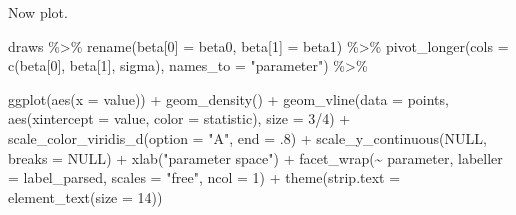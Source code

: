 \documentclass[
  letterpaper,
  DIV=11,
  numbers=noendperiod]{scrartcl}
\newenvironment{Shaded}{\begin{snugshade}}{\end{snugshade}}
\newcommand{\AttributeTok}[1]{\textcolor[rgb]{0.40,0.45,0.13}{#1}}
\newcommand{\ConstantTok}[1]{\textcolor[rgb]{0.56,0.35,0.01}{#1}}
\newcommand{\DecValTok}[1]{\textcolor[rgb]{0.68,0.00,0.00}{#1}}
\newcommand{\FunctionTok}[1]{\textcolor[rgb]{0.28,0.35,0.67}{#1}}
\newcommand{\NormalTok}[1]{\textcolor[rgb]{0.00,0.23,0.31}{#1}}
\newcommand{\OtherTok}[1]{\textcolor[rgb]{0.00,0.23,0.31}{#1}}
\newcommand{\SpecialCharTok}[1]{\textcolor[rgb]{0.37,0.37,0.37}{#1}}
\newcommand{\StringTok}[1]{\textcolor[rgb]{0.13,0.47,0.30}{#1}}
\begin{document}
Now plot.

\begin{Shaded}
\begin{Highlighting}[]
\NormalTok{draws }\SpecialCharTok{\%\textgreater{}\%} 
  \FunctionTok{rename}\NormalTok{(}\StringTok{\textasciigrave{}}\AttributeTok{beta[0]}\StringTok{\textasciigrave{}} \OtherTok{=}\NormalTok{ beta0,}
         \StringTok{\textasciigrave{}}\AttributeTok{beta[1]}\StringTok{\textasciigrave{}} \OtherTok{=}\NormalTok{ beta1) }\SpecialCharTok{\%\textgreater{}\%} 
  \FunctionTok{pivot\_longer}\NormalTok{(}\AttributeTok{cols =} \FunctionTok{c}\NormalTok{(}\StringTok{\textasciigrave{}}\AttributeTok{beta[0]}\StringTok{\textasciigrave{}}\NormalTok{, }\StringTok{\textasciigrave{}}\AttributeTok{beta[1]}\StringTok{\textasciigrave{}}\NormalTok{, sigma), }
               \AttributeTok{names\_to =} \StringTok{"parameter"}\NormalTok{) }\SpecialCharTok{\%\textgreater{}\%} 
  
  \FunctionTok{ggplot}\NormalTok{(}\FunctionTok{aes}\NormalTok{(}\AttributeTok{x =}\NormalTok{ value)) }\SpecialCharTok{+}
  \FunctionTok{geom\_density}\NormalTok{() }\SpecialCharTok{+}
  \FunctionTok{geom\_vline}\NormalTok{(}\AttributeTok{data =}\NormalTok{ points,}
             \FunctionTok{aes}\NormalTok{(}\AttributeTok{xintercept =}\NormalTok{ value, }\AttributeTok{color =}\NormalTok{ statistic),}
             \AttributeTok{size =} \DecValTok{3}\SpecialCharTok{/}\DecValTok{4}\NormalTok{) }\SpecialCharTok{+}
  \FunctionTok{scale\_color\_viridis\_d}\NormalTok{(}\AttributeTok{option =} \StringTok{"A"}\NormalTok{, }\AttributeTok{end =}\NormalTok{ .}\DecValTok{8}\NormalTok{) }\SpecialCharTok{+}
  \FunctionTok{scale\_y\_continuous}\NormalTok{(}\ConstantTok{NULL}\NormalTok{, }\AttributeTok{breaks =} \ConstantTok{NULL}\NormalTok{) }\SpecialCharTok{+}
  \FunctionTok{xlab}\NormalTok{(}\StringTok{"parameter space"}\NormalTok{) }\SpecialCharTok{+}
  \FunctionTok{facet\_wrap}\NormalTok{(}\SpecialCharTok{\textasciitilde{}}\NormalTok{ parameter, }\AttributeTok{labeller =}\NormalTok{ label\_parsed, }\AttributeTok{scales =} \StringTok{"free"}\NormalTok{, }\AttributeTok{ncol =} \DecValTok{1}\NormalTok{) }\SpecialCharTok{+}
  \FunctionTok{theme}\NormalTok{(}\AttributeTok{strip.text =} \FunctionTok{element\_text}\NormalTok{(}\AttributeTok{size =} \DecValTok{14}\NormalTok{))}
\end{Highlighting}
\end{Shaded}
\end{document}
